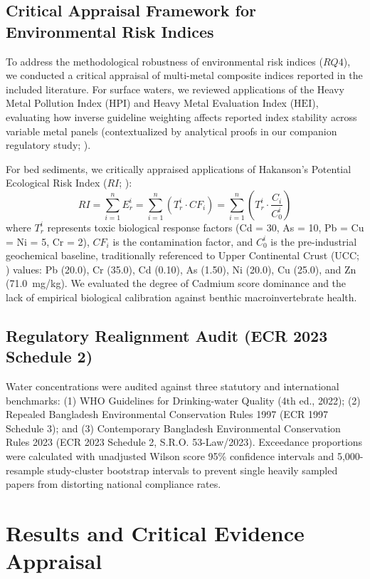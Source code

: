 \documentclass[authoryear,preprint,12pt]{elsarticle}
\begin{document}
\subsection{Critical Appraisal Framework for Environmental Risk Indices}
To address the methodological robustness of environmental risk indices ($RQ4$), we conducted a critical appraisal of multi-metal composite indices reported in the included literature. For surface waters, we reviewed applications of the Heavy Metal Pollution Index ($\mathrm{HPI}$) and Heavy Metal Evaluation Index ($\mathrm{HEI}$), evaluating how inverse guideline weighting affects reported index stability across variable metal panels (contextualized by analytical proofs in our companion regulatory study; \citealp{Mazumder2026Water}). 

For bed sediments, we critically appraised applications of Hakanson's Potential Ecological Risk Index ($RI$; \citealp{Hakanson1980}):
\begin{equation}
RI = \sum_{i=1}^n E_r^i = \sum_{i=1}^n \left(T_r^i \cdot CF_i\right) = \sum_{i=1}^n \left(T_r^i \cdot \frac{C_i}{C_0^i}\right)
\end{equation}
where $T_r^i$ represents toxic biological response factors (Cd = 30, As = 10, Pb = Cu = Ni = 5, Cr = 2), $CF_i$ is the contamination factor, and $C_0^i$ is the pre-industrial geochemical baseline, traditionally referenced to Upper Continental Crust (UCC; \citealp{Wedepohl1995}) values: Pb (20.0), Cr (35.0), Cd (0.10), As (1.50), Ni (20.0), Cu (25.0), and Zn (71.0~mg/kg). We evaluated the degree of Cadmium score dominance and the lack of empirical biological calibration against benthic macroinvertebrate health.

\subsection{Regulatory Realignment Audit (ECR 2023 Schedule 2)}
Water concentrations were audited against three statutory and international benchmarks:
(1) WHO Guidelines for Drinking-water Quality (4th ed., 2022);
(2) Repealed Bangladesh Environmental Conservation Rules 1997 (ECR 1997 Schedule 3); and
(3) Contemporary Bangladesh Environmental Conservation Rules 2023 (ECR 2023 Schedule 2, S.R.O. 53-Law/2023).
Exceedance proportions were calculated with unadjusted Wilson score 95\% confidence intervals and 5,000-resample study-cluster bootstrap intervals to prevent single heavily sampled papers from distorting national compliance rates.

\section{Results and Critical Evidence Appraisal}
\end{document}
